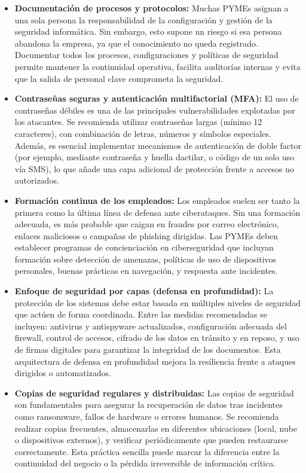 \documentclass[a4paper, 11pt]{article}
\begin{document}
\begin{itemize}
    
    \item \textbf{Documentación de procesos y protocolos:}  
    Muchas PYMEs asignan a una sola persona la responsabilidad de la configuración y gestión de la seguridad informática. Sin embargo, esto supone un riesgo si esa persona abandona la empresa, ya que el conocimiento no queda registrado. Documentar todos los procesos, configuraciones y políticas de seguridad permite mantener la continuidad operativa, facilita auditorías internas y evita que la salida de personal clave comprometa la seguridad.

    \item \textbf{Contraseñas seguras y autenticación multifactorial (MFA):}  
    El uso de contraseñas débiles es una de las principales vulnerabilidades explotadas por los atacantes. Se recomienda utilizar contraseñas largas (mínimo 12 caracteres), 
    con combinación de letras, números y símbolos especiales. Además, es esencial implementar mecanismos de autenticación de doble factor (por ejemplo, mediante contraseña y huella dactilar, o código de un solo uso vía SMS), lo que añade una capa adicional de protección frente a accesos no autorizados.

    \item \textbf{Formación continua de los empleados:}  
    Los empleados suelen ser tanto la primera como la última línea de defensa ante ciberataques. Sin una formación adecuada, es más probable que caigan en fraudes por correo electrónico, 
    enlaces maliciosos o campañas de phishing dirigidas. Las PYMEs deben establecer programas de concienciación en ciberseguridad que incluyan formación sobre detección de amenazas, políticas de uso de dispositivos personales, buenas prácticas en navegación, y respuesta ante incidentes.

    \item \textbf{Enfoque de seguridad por capas (defensa en profundidad):}  
    La protección de los sistemas debe estar basada en múltiples niveles de seguridad que actúen de forma coordinada. Entre las medidas recomendadas se incluyen: 
    antivirus y antispyware actualizados, configuración adecuada del firewall, control de accesos, cifrado de los datos en tránsito y en reposo, y uso de firmas digitales para garantizar la integridad de los documentos. Esta arquitectura de defensa en profundidad mejora la resiliencia frente a ataques dirigidos o automatizados.

    \item \textbf{Copias de seguridad regulares y distribuidas:}  
    Las copias de seguridad son fundamentales para asegurar la recuperación de datos tras incidentes como ransomware, fallos de hardware o errores humanos. Se recomienda realizar copias frecuentes, almacenarlas en diferentes ubicaciones (local, nube o dispositivos externos), y verificar periódicamente que pueden restaurarse correctamente. Esta práctica sencilla puede marcar la diferencia entre la continuidad del negocio o la pérdida irreversible de información crítica.

\end{itemize}
\end{document}
